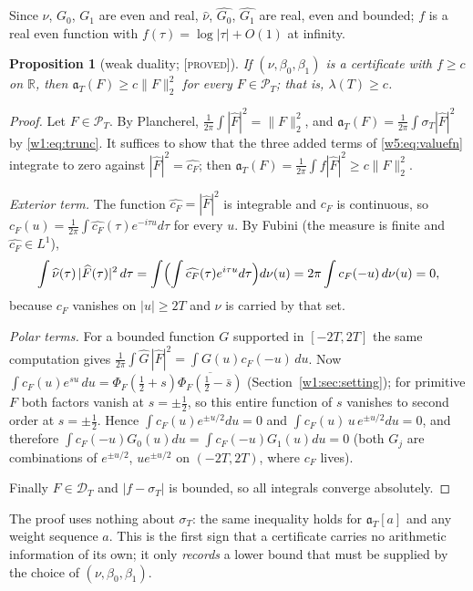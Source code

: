 \documentclass[11pt]{amsart}
\newtheorem{proposition}[theorem]{Proposition}
\theoremstyle{definition}
\theoremstyle{remark}
\numberwithin{equation}{section}
\newcommand{\R}{\mathbb{R}}
\newcommand{\Fh}{\widehat F}                           %
\newcommand{\cF}{c_F}                                  %
\newcommand{\PhiF}{\Phi_F}                             %
\newcommand{\PT}{\mathcal{P}_T}                        %
\newcommand{\DT}{\mathcal{D}_T}                        %
\newcommand{\aT}{\mathfrak{a}_T}                       %
\newcommand{\sT}{\sigma_T}                             %
\newcommand{\lam}{\lambda(T)}                          %
\newcommand{\stag}[1]{\textsc{[#1]}}
\newcommand{\PROVED}{\stag{proved}}
\begin{document}
Since $\nu$, $G_0$, $G_1$ are even and real, $\widehat\nu$, $\widehat{G_0}$, $\widehat{G_1}$ are real, even and bounded;
$f$ is a real even function with $f(\tau)=\log|\tau|+O(1)$ at infinity.

\begin{proposition}[weak duality; \PROVED]\label{w5:prop:weakdual}
If $(\nu,\beta_0,\beta_1)$ is a certificate with $f\ge c$ on $\R$, then $\aT(F)\ge c\|F\|_2^2$ for every $F\in\PT$; that is,
$\lam\ge c$.
\end{proposition}

\begin{proof}
Let $F\in\PT$. By Plancherel, $\frac1{2\pi}\int|\Fh|^2=\|F\|_2^2$, and $\aT(F)=\frac1{2\pi}\int\sT|\Fh|^2$ by
\eqref{w1:eq:trunc}. It suffices to show that the three added terms of \eqref{w5:eq:valuefn} integrate to zero against
$|\Fh|^2=\widehat{\cF}$; then $\aT(F)=\frac1{2\pi}\int f|\Fh|^2\ge c\|F\|_2^2$.

\emph{Exterior term.} The function $\widehat{\cF}=|\Fh|^2$ is integrable and $\cF$ is continuous, so
$\cF(u)=\frac1{2\pi}\int\widehat{\cF}(\tau)e^{-i\tau u}d\tau$ for every $u$. By Fubini (the measure is finite and
$\widehat{\cF}\in L^1$),
\[
  \int\widehat\nu(\tau)\,|\Fh(\tau)|^2\,d\tau=\int\Bigl(\int\widehat{\cF}(\tau)e^{i\tau u}d\tau\Bigr)d\nu(u)
  =2\pi\int\cF(-u)\,d\nu(u)=0,
\]
because $\cF$ vanishes on $|u|\ge2T$ and $\nu$ is carried by that set.

\emph{Polar terms.} For a bounded function $G$ supported in $[-2T,2T]$ the same computation gives
$\frac1{2\pi}\int\widehat G\,|\Fh|^2=\int G(u)\cF(-u)\,du$. Now
$\int\cF(u)e^{su}\,du=\PhiF(\tfrac12+s)\overline{\PhiF(\tfrac12-\bar s)}$ (Section~\ref{w1:sec:setting}); for primitive $F$
both factors vanish at $s=\pm\frac12$, so this entire function of $s$ vanishes to second order at $s=\pm\frac12$. Hence
$\int\cF(u)e^{\pm u/2}du=0$ and $\int\cF(u)\,u\,e^{\pm u/2}du=0$, and therefore
$\int\cF(-u)G_0(u)du=\int\cF(-u)G_1(u)du=0$ (both $G_j$ are combinations of $e^{\pm u/2}$, $ue^{\pm u/2}$ on
$(-2T,2T)$, where $\cF$ lives).

Finally $F\in\DT$ and $|f-\sT|$ is bounded, so all integrals converge absolutely.
\end{proof}

The proof uses nothing about $\sT$: the same inequality holds for $\aT[a]$ and any weight sequence $a$. This is the first
sign that a certificate carries no arithmetic information of its own; it only \emph{records} a lower bound that must be
supplied by the choice of $(\nu,\beta_0,\beta_1)$.
\end{document}
